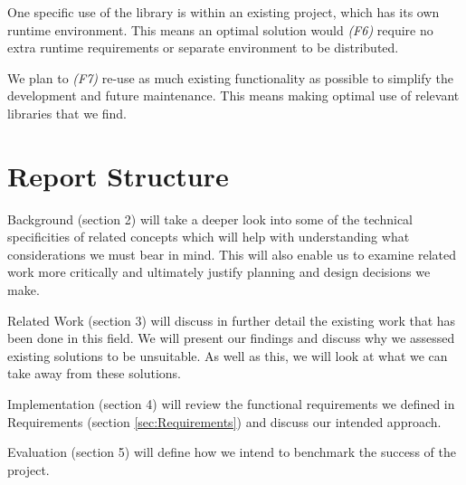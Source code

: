 One specific use of the library is within an existing project, which has its own runtime environment. This means an optimal solution would \emph{(F6)} require no extra runtime requirements or separate environment to be distributed.

We plan to \emph{(F7)} re-use as much existing functionality as possible to simplify the development and future maintenance. This means making optimal use of relevant libraries that we find.

\section{Report Structure}

Background (section 2) will take a deeper look into some of the technical specificities of related concepts which will help with understanding what considerations we must bear in mind. This will also enable us to examine related work more critically and ultimately justify planning and design decisions we make.

Related Work (section 3) will discuss in further detail the existing work that has been done in this field. We will present our findings and discuss why we assessed existing solutions to be unsuitable. As well as this, we will look at what we can take away from these solutions.

Implementation (section 4) will review the functional requirements we defined in Requirements (section \ref{sec:Requirements}) and discuss our intended approach.

Evaluation (section 5) will define how we intend to benchmark the success of the project.